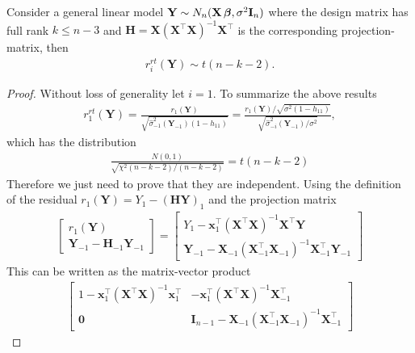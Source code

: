 \begin{proposition}
    Consider a general linear model $\textbf{Y} \sim N_n(\textbf{X} \operatorname{\boldsymbol{\beta}}, \sigma^2 \textbf{I}_n)$ where the design matrix has full rank $k \leq n-3$ and $\textbf{H} = \textbf{X} (\textbf{X}^\top \textbf{X})^{-1}\textbf{X}^\top$ is the corresponding projection-matrix, then
    \begin{align*}
        r_i^{rt}(\textbf{Y}) \sim t(n-k-2).
    \end{align*}
\end{proposition}
\begin{proof}
    Without loss of generality let $i=1$. 
    To summarize the above results
    \begin{align*}
        r_1^{rt}(\textbf{Y}) = \frac{r_1(\textbf{Y})}{\sqrt{\hat{\sigma}^2_{-1}(\textbf{Y}_{-1})(1-h_{11})}}
        =
        \frac{r_1(\textbf{Y})/ \sqrt{\sigma^2 (1-h_{11})}}{\sqrt{\hat{\sigma}_{-i}^2 (\textbf{Y}_{-1})/\sigma^2}},
    \end{align*}
    which has the distribution
    \begin{align*}
        \frac{N(0,1)}{\sqrt{\chi^2(n-k-2)/(n-k-2)}} = t(n-k-2)
    \end{align*}
    Therefore we just need to prove that they are independent.
    Using the definition of the residual $r_1(\textbf{Y}) = Y_1 -  (\textbf{HY})_1$ and the projection matrix
    \begin{align*}
        \begin{bmatrix}
            r_1(\textbf{Y}) \\
            \textbf{Y}_{-1} - \textbf{H}_{-1} \textbf{Y}_{-1}
        \end{bmatrix}
        =
        \begin{bmatrix}
            Y_1 - \textbf{x}_1^\top (\textbf{X}^\top \textbf{X})^{-1} \textbf{X}^\top \textbf{Y} \\
            \textbf{Y}_{-1} - \textbf{X}_{-1} (\textbf{X}_{-1}^\top \textbf{X}_{-1})^{-1} \textbf{X}_{-1}^\top \textbf{Y}_{-1}
        \end{bmatrix}
    \end{align*}
    This can be written as the matrix-vector product
    \begin{align*}
        \begin{bmatrix}
            1 - \textbf{x}_1^\top (\textbf{X}^\top \textbf{X})^{-1} \textbf{x}_1^\top & - \textbf{x}_1^\top (\textbf{X}^\top \textbf{X})^{-1} \textbf{X}_{-1}^\top \\
            \textbf{0} & \textbf{I}_{n-1} - \textbf{X}_{-1} (\textbf{X}_{-1}^\top \textbf{X}_{-1})^{-1} \textbf{X}_{-1}^\top

\end{bmatrix}
\end{align*}
\end{proof}
